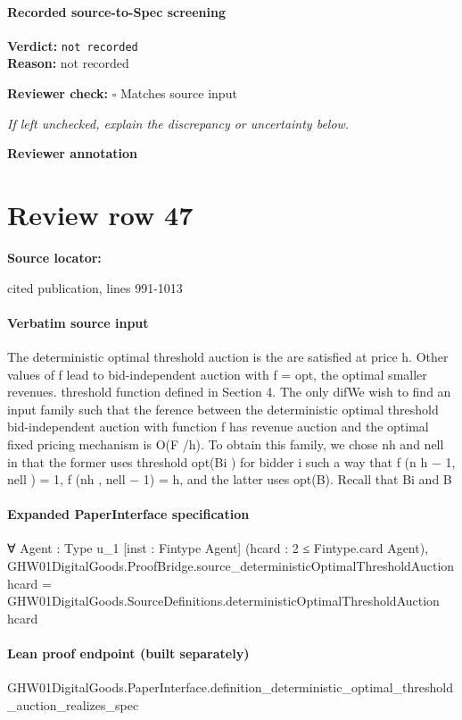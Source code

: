 \documentclass[10pt]{article}
\newcommand{\reviewerbox}{%
  \par\noindent\fbox{\parbox{0.96\linewidth}{\rule{0pt}{0.38in}}}\par
}
\newcommand{\reviewmatch}[1]{%
  \par\noindent\textbf{Reviewer check:} $\square$\; #1\par
  \noindent\emph{If left unchecked, explain the discrepancy or uncertainty below.}\par
}
\begin{document}
\paragraph{Recorded source-to-Spec screening}
\textbf{Verdict:} \texttt{not recorded}
\\
\textbf{Reason:} not recorded
\reviewmatch{Matches source input}
\noindent\textbf{Reviewer annotation}\par
\reviewerbox
\clearpage
\hypertarget{source-claim-5f3388e17a33f6df}{}
\section*{Review row 47}
\textbf{Source locator:} {\footnotesize\raggedright cited publication, lines 991-\allowbreak{}1013\par}
\paragraph{Verbatim source input}
\begin{ReviewVerbatim}
The deterministic optimal threshold auction is the
are satisfied at price h. Other values of f lead to
bid-independent auction with f = opt, the optimal
smaller revenues.
threshold function defined in Section 4. The only difWe wish to find an input family such that the
ference between the deterministic optimal threshold
bid-independent
auction with function f has revenue
auction and the optimal fixed pricing mechanism is
O(F
/h).
To
obtain
this family, we chose nh and nell in
that the former uses threshold opt(Bi ) for bidder i
such
a
way
that
f
(n
h − 1, nell ) = 1, f (nh , nell − 1) = h,
and the latter uses opt(B). Recall that Bi and B
\end{ReviewVerbatim}


\paragraph{Expanded PaperInterface specification}
\begin{ReviewVerbatim}
∀ {Agent : Type u_1} [inst : Fintype Agent] (hcard : 2 ≤ Fintype.card Agent),
  GHW01DigitalGoods.ProofBridge.source_deterministicOptimalThresholdAuction hcard =
    GHW01DigitalGoods.SourceDefinitions.deterministicOptimalThresholdAuction hcard
\end{ReviewVerbatim}

\paragraph{Lean proof endpoint (built separately)}\begin{ReviewVerbatim}
GHW01DigitalGoods.PaperInterface.definition_deterministic_optimal_threshold_auction_realizes_spec
\end{ReviewVerbatim}
\end{document}
